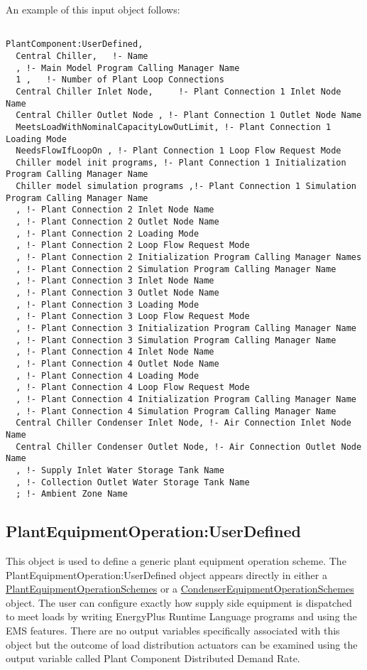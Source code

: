 An example of this input object follows:

\begin{lstlisting}

PlantComponent:UserDefined,
  Central Chiller,   !- Name
  , !- Main Model Program Calling Manager Name
  1 ,   !- Number of Plant Loop Connections
  Central Chiller Inlet Node,     !- Plant Connection 1 Inlet Node Name
  Central Chiller Outlet Node , !- Plant Connection 1 Outlet Node Name
  MeetsLoadWithNominalCapacityLowOutLimit, !- Plant Connection 1 Loading Mode
  NeedsFlowIfLoopOn , !- Plant Connection 1 Loop Flow Request Mode
  Chiller model init programs, !- Plant Connection 1 Initialization Program Calling Manager Name
  Chiller model simulation programs ,!- Plant Connection 1 Simulation Program Calling Manager Name
  , !- Plant Connection 2 Inlet Node Name
  , !- Plant Connection 2 Outlet Node Name
  , !- Plant Connection 2 Loading Mode
  , !- Plant Connection 2 Loop Flow Request Mode
  , !- Plant Connection 2 Initialization Program Calling Manager Names
  , !- Plant Connection 2 Simulation Program Calling Manager Name
  , !- Plant Connection 3 Inlet Node Name
  , !- Plant Connection 3 Outlet Node Name
  , !- Plant Connection 3 Loading Mode
  , !- Plant Connection 3 Loop Flow Request Mode
  , !- Plant Connection 3 Initialization Program Calling Manager Name
  , !- Plant Connection 3 Simulation Program Calling Manager Name
  , !- Plant Connection 4 Inlet Node Name
  , !- Plant Connection 4 Outlet Node Name
  , !- Plant Connection 4 Loading Mode
  , !- Plant Connection 4 Loop Flow Request Mode
  , !- Plant Connection 4 Initialization Program Calling Manager Name
  , !- Plant Connection 4 Simulation Program Calling Manager Name
  Central Chiller Condenser Inlet Node, !- Air Connection Inlet Node Name
  Central Chiller Condenser Outlet Node, !- Air Connection Outlet Node Name
  , !- Supply Inlet Water Storage Tank Name
  , !- Collection Outlet Water Storage Tank Name
  ; !- Ambient Zone Name
\end{lstlisting}

\subsection{PlantEquipmentOperation:UserDefined}\label{plantequipmentoperationuserdefined}

This object is used to define a generic plant equipment operation scheme. The PlantEquipmentOperation:UserDefined object appears directly in either a \hyperref[plantequipmentoperationschemes]{PlantEquipmentOperationSchemes} or a \hyperref[condenserequipmentoperationschemes]{CondenserEquipmentOperationSchemes} object. The user can configure exactly how supply side equipment is dispatched to meet loads by writing EnergyPlus Runtime Language programs and using the EMS features. There are no output variables specifically associated with this object but the outcome of load distribution actuators can be examined using the output variable called Plant Component Distributed Demand Rate.

